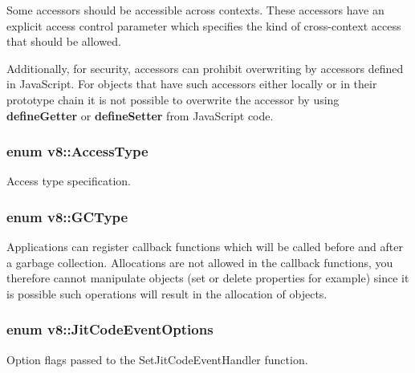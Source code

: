 Some accessors should be accessible across contexts. These accessors have an explicit access control parameter which specifies the kind of cross-\/context access that should be allowed.

Additionally, for security, accessors can prohibit overwriting by accessors defined in Java\-Script. For objects that have such accessors either locally or in their prototype chain it is not possible to overwrite the accessor by using {\bfseries define\-Getter} or {\bfseries define\-Setter} from Java\-Script code. \hypertarget{namespacev8_add8bef6469c5b94706584124e610046c}{
\subsubsection[{Access\-Type}]{\setlength{\rightskip}{0pt plus 5cm}enum {\bf v8\-::\-Access\-Type}}}\label{namespacev8_add8bef6469c5b94706584124e610046c}
Access type specification. \hypertarget{namespacev8_ac109d6f27e0c0f9ef4e98bcf7a806cf2}{
\subsubsection[{G\-C\-Type}]{\setlength{\rightskip}{0pt plus 5cm}enum {\bf v8\-::\-G\-C\-Type}}}\label{namespacev8_ac109d6f27e0c0f9ef4e98bcf7a806cf2}
Applications can register callback functions which will be called before and after a garbage collection. Allocations are not allowed in the callback functions, you therefore cannot manipulate objects (set or delete properties for example) since it is possible such operations will result in the allocation of objects. \hypertarget{namespacev8_a06f34fa4fa4cfc8518366808d1d461c1}{
\subsubsection[{Jit\-Code\-Event\-Options}]{\setlength{\rightskip}{0pt plus 5cm}enum {\bf v8\-::\-Jit\-Code\-Event\-Options}}}\label{namespacev8_a06f34fa4fa4cfc8518366808d1d461c1}
Option flags passed to the Set\-Jit\-Code\-Event\-Handler function. 


